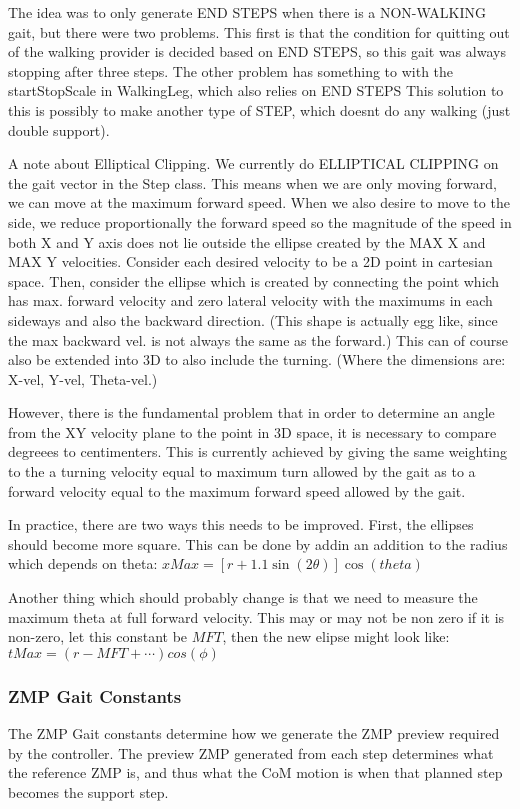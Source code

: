 \documentclass[11pt]{article}
\begin{document}
\begin{itemize}
The idea was to only generate END STEPS when there is a NON-WALKING gait,
but there were two problems. This first is that the condition for quitting
out of the walking provider is decided based on END STEPS, so this gait
was always stopping after three steps. The other problem has something
to with the startStopScale in WalkingLeg, which also relies on END STEPS
This solution to this is possibly to make another type of STEP, which
doesnt do any walking (just double support).

\end{itemize}

A note about Elliptical Clipping.  We currently do ELLIPTICAL CLIPPING on the
gait vector in the Step class.  This means when we are only moving forward,
we can move at the maximum forward speed. When we also desire to move to the
side, we reduce proportionally the forward speed so the magnitude of the speed
in both X and Y axis does not lie outside the ellipse created by the MAX X and
MAX Y velocities.  Consider each desired velocity to be a 2D point in
cartesian space. Then, consider the ellipse  which is created by connecting the
point which has max. forward velocity and zero lateral velocity with the maximums in each sideways and also the backward direction. (This shape is actually egg like, since the max backward vel. is not always the same as the forward.)
This can of course also be extended into 3D to also include the turning. (Where
 the dimensions are: X-vel, Y-vel, Theta-vel.)

However, there is the fundamental problem that in order to determine an angle
from the XY velocity plane to the point in 3D space, it is necessary to
compare degreees to centimenters.  This is currently achieved by giving the
same weighting to the a turning velocity equal to maximum turn allowed by
the gait as to a forward velocity equal to the maximum forward speed allowed
by the gait.

In practice, there are two ways this needs to be improved. First, the ellipses
should become more square. This can be done by addin an addition to the radius
which depends on theta:
$xMax = [r + 1.1\sin(2\theta )]\cos(theta)$

Another thing which should probably change is that we need to measure
the maximum theta at full forward velocity. This may or may not be non zero
if it is non-zero, let this constant be $MFT$, then the new elipse might look
like:
$tMax = (r - MFT + \cdots)cos(\phi)$

\subsubsection{ZMP Gait Constants}
The ZMP Gait constants determine how we generate the ZMP preview required
by the controller.  The preview ZMP generated from each step determines
what the reference ZMP is, and thus what the CoM motion is when that planned
step becomes the support step.
\end{document}
